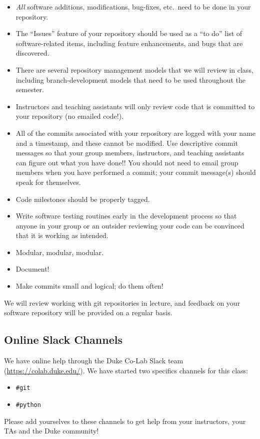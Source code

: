 \begin{itemize}
    \item \emph{All} software additions, modifications, bug-fixes, etc.\ need
        to be done in your repository.
    \item The ``Issues'' feature of your repository should be used as a ``to
        do'' list of software-related items, including feature enhancements,
        and bugs that are discovered.
    \item There are several repository management models that we will review in class,
        including branch-development models that need to be used throughout the semester.
    \item Instructors and teaching assistants will only review code that is
    committed to your repository (no emailed code!).
    \item All of the commits associated with your repository are logged with
    your name and a timestamp, and these cannot be modified.  Use descriptive
    commit messages so that your group members, instructors, and teaching
    assistants can figure out what you have done!!  You should not need to email
    group members when you have performed a commit; your commit message(s)
    should speak for themselves.
    \item Code milestones should be properly tagged.
    \item Write software testing routines early in the development process so
        that anyone in your group or an outsider reviewing your code can be
        convinced that it is working as intended.
    \item Modular, modular, modular.
    \item Document!
    \item Make commits small and logical; do them often!
\end{itemize}

We will review working with git repositories in lecture, and feedback
on your software repository will be provided on a regular basis.

\subsection*{Online Slack Channels}
We have online help through the Duke Co-Lab Slack team
(\url{https://colab.duke.edu/}).  We have started two specifics channels for
this class:
\begin{itemize}
  \item \verb+#git+
  \item \verb+#python+
\end{itemize}
Please add yourselves to these channels to get help from your instructors, your
TAs and the Duke community!

